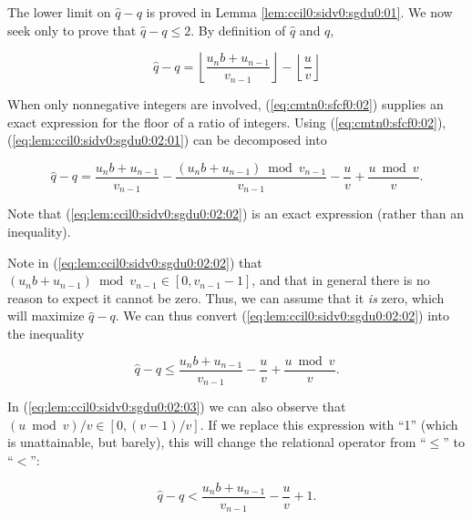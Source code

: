 \begin{vworklemmaproof}
The lower limit on $\hat{q} - q$ is proved in Lemma \ref{lem:ccil0:sidv0:sgdu0:01}.
We now seek only to prove that $\hat{q} - q \leq 2$.
By definition of $\hat{q}$ and $q$, 

\begin{equation}
\label{eq:lem:ccil0:sidv0:sgdu0:02:01}
\hat{q} - q  =    \left\lfloor {\frac{u_n b + u_{n-1}}{v_{n-1}}} \right\rfloor 
                  - \left\lfloor {\frac{u}{v}} \right\rfloor 
\end{equation}

When only nonnegative integers are involved, 
(\ref{eq:cmtn0:sfcf0:02}) 
supplies an exact expression for the floor of a 
ratio of integers.  Using (\ref{eq:cmtn0:sfcf0:02}),
(\ref{eq:lem:ccil0:sidv0:sgdu0:02:01}) can be decomposed into

\begin{equation}
\label{eq:lem:ccil0:sidv0:sgdu0:02:02}
\hat{q} - q  =    \frac{u_n b + u_{n-1}}{v_{n-1}}
                - \frac{(u_n b + u_{n-1}) \bmod v_{n-1}}{v_{n-1}}
                - \frac{u}{v}
                + \frac{u \bmod v}{v} . 
\end{equation}

\noindent{}Note that (\ref{eq:lem:ccil0:sidv0:sgdu0:02:02}) is an exact 
expression (rather than an
inequality).

Note in (\ref{eq:lem:ccil0:sidv0:sgdu0:02:02}) that
$(u_n b + u_{n-1}) \bmod v_{n-1} \in [0, v_{n-1}-1]$, and that in general
there is no reason to expect it cannot be zero.  Thus, we can assume that
it \emph{is} zero, which will maximize $\hat{q}-q$.  We can thus convert
(\ref{eq:lem:ccil0:sidv0:sgdu0:02:02}) into the inequality

\begin{equation}
\label{eq:lem:ccil0:sidv0:sgdu0:02:03}
\hat{q} - q  \leq \frac{u_n b + u_{n-1}}{v_{n-1}}
                - \frac{u}{v}
                + \frac{u \bmod v}{v} . 
\end{equation}

In (\ref{eq:lem:ccil0:sidv0:sgdu0:02:03}) we can also observe that
$(u \bmod v)/v \in [0, (v-1)/v]$.  If we replace this expression with 
``1'' (which is unattainable, but barely), this will change the relational
operator from ``$\leq$'' to ``$<$'':

\begin{equation}
\label{eq:lem:ccil0:sidv0:sgdu0:02:04}
\hat{q} - q  <    \frac{u_n b + u_{n-1}}{v_{n-1}}
                - \frac{u}{v}
                + 1 . 
\end{equation}


\end{vworklemmaproof}
